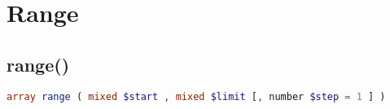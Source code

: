 \begin{lstlisting}[language=PHP]

\end{lstlisting}



\begin{lstlisting}[language=PHP]

\end{lstlisting}




\section{Range}

\subsection{range()}





\begin{lstlisting}[language=PHP]
array range ( mixed $start , mixed $limit [, number $step = 1 ] )
\end{lstlisting}




\begin{lstlisting}[language=PHP]

\end{lstlisting}




\begin{lstlisting}[language=PHP]

\end{lstlisting}


\begin{lstlisting}[language=PHP]

\end{lstlisting}




\begin{lstlisting}[language=PHP]

\end{lstlisting}




\begin{lstlisting}[language=PHP]

\end{lstlisting}




\begin{lstlisting}[language=PHP]

\end{lstlisting}



